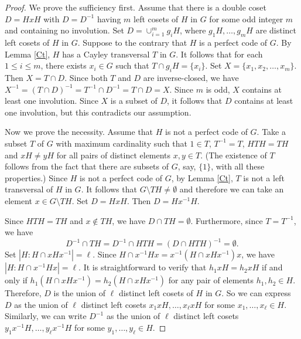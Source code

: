 \documentclass[12pt, a4paper]{article}
\theoremstyle{definition}
\begin{document}
\begin{proof}
We prove the sufficiency first. Assume that there is a double coset $D=HxH$ with $D=D^{-1}$ having $m$ left cosets of $H$ in $G$ for some odd integer $m$ and containing no involution. Set $D=\cup_{i=1}^{m}g_{i}H$, where $g_{1}H, \ldots, g_{m}H$ are distinct left cosets of $H$ in $G$. Suppose to the contrary that $H$ is a perfect code of $G$. By Lemma \ref{Ct}, $H$ has a Cayley transversal $T$ in $G$. It follows that for each $1\leq i\leq m$, there exists $x_i \in G$ such that $T\cap g_{i}H = \{x_{i}\}$. Set $X=\{x_1,x_2,\ldots,x_m\}$. Then $X=T\cap D$. Since both $T$ and $D$ are inverse-closed, we have
$X^{-1}=(T\cap D)^{-1}=T^{-1}\cap D^{-1}=T\cap D=X$. Since $m$ is odd, $X$ contains at least one involution. Since $X$ is a subset of $D$, it follows that $D$ contains at least one involution, but this contradicts our assumption.

Now we prove the necessity. Assume that $H$ is not a perfect code of $G$.
Take a subset $T$ of $G$ with maximum cardinality such that $1\in T$, $T^{-1}=T$, $HTH=TH$ and $xH\neq yH$ for all pairs of distinct elements $x,y\in T$. (The existence of $T$ follows from the fact that there are subsets of $G$, say, $\{1\}$, with all these properties.) Since $H$ is not a perfect code of $G$,
by Lemma \ref{Ct}, $T$ is not a left transversal of $H$ in $G$. It follows that  $G \setminus TH \neq\emptyset$ and therefore we can take an element $x\in G \setminus TH$. Set $D=HxH$. Then $D=Hx^{-1}H$.

Since $HTH=TH$ and $x\notin TH$, we have $D\cap TH=\emptyset$. Furthermore, since $T=T^{-1}$, we have
\begin{equation*}
D^{-1}\cap TH=D^{-1}\cap HTH=(D\cap HTH)^{-1}=\emptyset.
\end{equation*}
Set $|H:H\cap xHx^{-1}|=\ell$. Since $H\cap x^{-1}Hx=x^{-1}(H\cap xHx^{-1})x$, we have $|H:H\cap x^{-1}Hx|=\ell$. It is straightforward to verify that $h_{1}xH=h_{2}xH$ if and only if $h_{1}(H\cap xHx^{-1})=h_{2}(H\cap xHx^{-1})$ for any pair of elements $h_{1},h_{2}\in H$. Therefore, $D$ is the union of $\ell$ distinct left cosets of $H$ in $G$. So we can express $D$ as the union of $\ell$ distinct left cosets $x_{1}xH,\ldots,x_{\ell}xH$ for some $x_{1},\ldots,x_{\ell} \in H$. Similarly, we can write $D^{-1}$ as the union of $\ell$ distinct left cosets $y_{1}x^{-1}H,\ldots,y_{\ell}x^{-1}H$ for some $y_{1},\ldots,y_{\ell}\in H$.


\end{proof}
\end{document}
